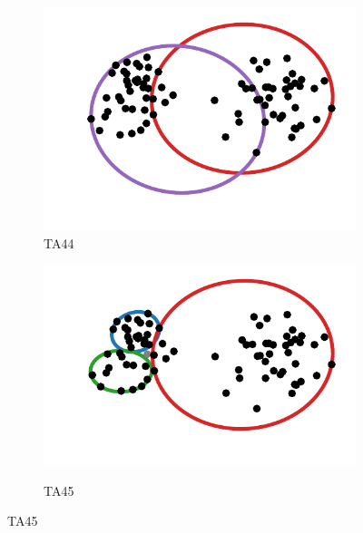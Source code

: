 \begin{figure}[!htb]
	\caption{Optimal solutions for instances TA44 and TA45.}
	\begin{subfigure}{.5\textwidth}
			\centering
		\caption{TA44}
		\includegraphics[scale=.8]{tex/figures/TA044}

		\label{fig:TA043}
	\end{subfigure}
	\begin{subfigure}{.5\textwidth}
			\centering
		\caption{TA45}
		\includegraphics[scale=.8]{tex/figures/TA045}
		\label{fig:TA044}
	\end{subfigure}
\label{fig:TA44-45}
	\fautor
\end{figure}
